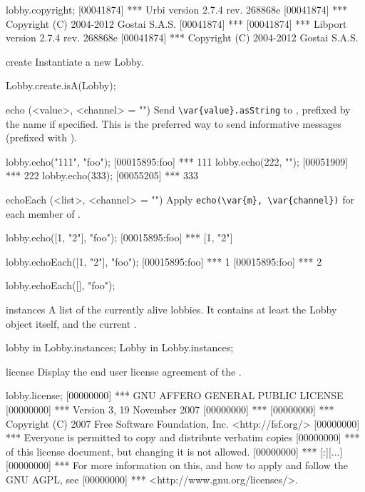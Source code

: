 \begin{urbiscriptapi}
\begin{urbiscript}
lobby.copyright;
[00041874] *** Urbi version 2.7.4 rev. 268868e
[00041874] *** Copyright (C) 2004-2012 Gostai S.A.S.
[00041874] ***
[00041874] *** Libport version 2.7.4 rev. 268868e
[00041874] *** Copyright (C) 2004-2012 Gostai S.A.S.
\end{urbiscript}


\item[create]
  Instantiate a new Lobby.
\begin{urbiassert}
Lobby.create.isA(Lobby);
\end{urbiassert}


\item[echo](<value>, <channel> = "")%
  Send \lstinline|\var{value}.asString| to \this, prefixed
  by the   name if specified.  This is
  the preferred way to send informative messages (prefixed with
  \samp{***}).
\begin{urbiscript}
lobby.echo("111", "foo");
[00015895:foo] *** 111
lobby.echo(222, "");
[00051909] *** 222
lobby.echo(333);
[00055205] *** 333
\end{urbiscript}


\item[echoEach](<list>, <channel> = "")%
  Apply \lstinline|echo(\var{m}, \var{channel})| for each member  of
  .
\begin{urbiscript}
lobby.echo([1, "2"], "foo");
[00015895:foo] *** [1, "2"]

lobby.echoEach([1, "2"], "foo");
[00015895:foo] *** 1
[00015895:foo] *** 2

lobby.echoEach([], "foo");
\end{urbiscript}




\item[instances]
  A list of the currently alive lobbies.  It contains at least the Lobby
  object itself, and the current .
\begin{urbiassert}
lobby in Lobby.instances;
Lobby in Lobby.instances;
\end{urbiassert}


\item[license]
  Display the end user license agreement of the \usdk.
\begin{urbiscript}
lobby.license;
[00000000] ***                     GNU AFFERO GENERAL PUBLIC LICENSE
[00000000] ***                        Version 3, 19 November 2007
[00000000] ***
[00000000] ***  Copyright (C) 2007 Free Software Foundation, Inc. <http://fsf.org/>
[00000000] ***  Everyone is permitted to copy and distribute verbatim copies
[00000000] ***  of this license document, but changing it is not allowed.
[00000000] ***
[:][...]
[00000000] *** For more information on this, and how to apply and follow the GNU AGPL, see
[00000000] *** <http://www.gnu.org/licenses/>.
\end{urbiscript}



\end{urbiscriptapi}

